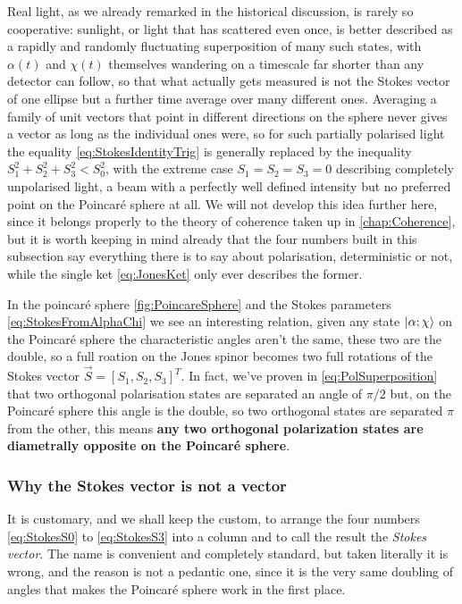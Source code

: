         Real light, as we already remarked in the historical discussion, is rarely so cooperative: sunlight, or light that has scattered even once, is better described as a rapidly and randomly fluctuating superposition of many such states, with $\alpha(t)$ and $\chi(t)$ themselves wandering on a timescale far shorter than any detector can follow, so that what actually gets measured is not the Stokes vector of one ellipse but a further time average over many different ones. Averaging a family of unit vectors that point in different directions on the sphere never gives a vector as long as the individual ones were, so for such partially polarised light the equality \ref{eq:StokesIdentityTrig} is generally replaced by the inequality $S_1^2+S_2^2+S_3^2<S_0^2$, with the extreme case $S_1=S_2=S_3=0$ describing completely unpolarised light, a beam with a perfectly well defined intensity but no preferred point on the Poincaré sphere at all. We will not develop this idea further here, since it belongs properly to the theory of coherence taken up in \ref{chap:Coherence}, but it is worth keeping in mind already that the four numbers built in this subsection say everything there is to say about polarisation, deterministic or not, while the single ket \ref{eq:JonesKet} only ever describes the former.

        In the poincaré sphere \ref{fig:PoincareSphere} and the Stokes parameters \ref{eq:StokesFromAlphaChi} we see an interesting relation, given any state $\ket{\alpha;\chi}$ on the Poincaré sphere the characteristic angles aren't the same, these two are the double, so a full roation on the Jones spinor becomes two full rotations of the Stokes vector $\vec{S} = \left[S_1, S_2, S_3\right]^T$. In fact, we've proven in \ref{eq:PolSuperposition} that two orthogonal polarisation states are separated an angle of $\pi/2$ but, on the Poincaré sphere this angle is the double, so two orthogonal states are separated $\pi$ from the other, this means \textbf{any two orthogonal polarization states are diametrally opposite on the Poincaré sphere}.

        \subsubsection{Why the Stokes vector is not a vector}

            It is customary, and we shall keep the custom, to arrange the four numbers \ref{eq:StokesS0} to \ref{eq:StokesS3} into a column and to call the result the \textit{Stokes vector}. The name is convenient and completely standard, but taken literally it is wrong, and the reason is not a pedantic one, since it is the very same doubling of angles that makes the Poincaré sphere work in the first place.

